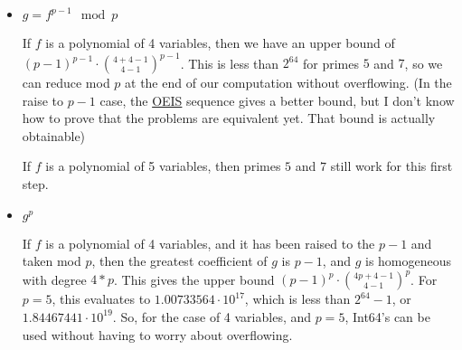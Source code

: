 \documentclass{article}
\begin{document}
\begin{itemize}
    \item $g = f^{p - 1}\mod p$
    
    If $f$ is a polynomial of 4 variables, then we have an upper bound of $(p - 1)^{p-1} \cdot \binom{4 + 4 - 1}{4 - 1}^{p - 1}$. This is less than $2^{64}$ for primes $5$ and $7$, so we can reduce mod $p$ at the end of our computation without overflowing. (In the raise to $p-1$ case, the \href{https://oeis.org/A333901/internal}{OEIS} sequence gives a better bound, but I don't know how to prove that the problems are equivalent yet. That bound is actually obtainable)

    If $f$ is a polynomial of 5 variables, then primes $5$ and $7$ still work for this first step.

    \item $g ^ p$
    
    If $f$ is a polynomial of 4 variables, and it has been raised to the $p-1$ and taken mod $p$, then the greatest coefficient of $g$ is $p-1$, and $g$ is homogeneous with degree $4 * p$. This gives the upper bound $(p - 1)^{p} \cdot \binom{4p + 4 - 1}{4 - 1}^{p}$. For $p=5$, this evaluates to $1.00733564 \cdot 10^{17}$, which is less than $2^{64} - 1$, or $1.84467441 \cdot 10^{19}$. So, for the case of 4 variables, and $p = 5$, Int64's can be used without having to worry about overflowing.
\end{itemize}
\end{document}
